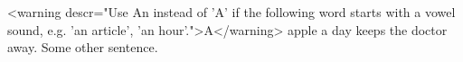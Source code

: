 
    <warning descr="Use An instead of 'A' if the following word starts with a vowel sound, e.g. 'an article', 'an hour'.">A</warning> apple a day keeps the doctor away.
    Some other sentence.
